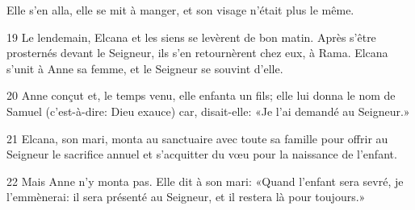 Elle s’en alla, elle se mit à manger, et son visage n’était plus le même.

19 Le lendemain, Elcana et les siens se levèrent de bon matin. Après s’être prosternés devant le Seigneur, ils s’en retournèrent chez eux, à Rama. Elcana s’unit à Anne sa femme, et le Seigneur se souvint d’elle.

20 Anne conçut et, le temps venu, elle enfanta un fils; elle lui donna le nom de Samuel (c’est-à-dire: Dieu exauce) car, disait-elle: «Je l’ai demandé au Seigneur.»

21 Elcana, son mari, monta au sanctuaire avec toute sa famille pour offrir au Seigneur le sacrifice annuel et s’acquitter du vœu pour la naissance de l’enfant.

22 Mais Anne n’y monta pas. Elle dit à son mari: «Quand l’enfant sera sevré, je l’emmènerai: il sera présenté au Seigneur, et il restera là pour toujours.»
